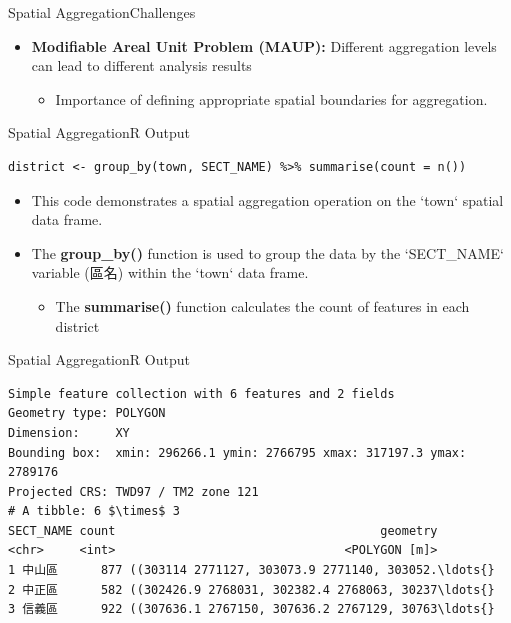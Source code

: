 \documentclass[dvipsnames,hyperref={pdfpagelabels=false}]{beamer}
\begin{document}
\begin{frame}{Spatial Aggregation}{Challenges}	
	\begin{itemize}
		\item \textbf{Modifiable Areal Unit Problem (MAUP):} Different aggregation levels can lead to different analysis results
									\vspace{0.2cm}
			\begin{itemize}
		\item Importance of defining appropriate spatial boundaries for aggregation.
			\end{itemize}
	\end{itemize}
\end{frame}










\begin{frame}[fragile]{Spatial Aggregation}{R Output}
\begin{lstlisting}
district <- group_by(town, SECT_NAME) %>% summarise(count = n())
\end{lstlisting}
\begin{itemize}
	\item This code demonstrates a spatial aggregation operation on the `town` spatial data frame.
	\vspace{0.2cm}
	\item The \textbf{group\_by()} function is used to group the data by the `SECT\_NAME` variable (區名) within the `town` data frame.
	
	\begin{itemize}
		\vspace{0.2cm}
		\item The \textbf{summarise()} function calculates the count of features in each district 
	\end{itemize}
	
\end{itemize}
\end{frame}




\begin{frame}[fragile]{Spatial Aggregation}{R Output}
	
	\tiny
	
\begin{lstlisting}
Simple feature collection with 6 features and 2 fields
Geometry type: POLYGON
Dimension:     XY
Bounding box:  xmin: 296266.1 ymin: 2766795 xmax: 317197.3 ymax: 2789176
Projected CRS: TWD97 / TM2 zone 121
# A tibble: 6 $\times$ 3
SECT_NAME count                                     geometry
<chr>     <int>                                <POLYGON [m]>
1 中山區      877 ((303114 2771127, 303073.9 2771140, 303052.\ldots{}
2 中正區      582 ((302426.9 2768031, 302382.4 2768063, 30237\ldots{}
3 信義區      922 ((307636.1 2767150, 307636.2 2767129, 30763\ldots{}
\end{lstlisting}
	
\end{frame}
\end{document}
